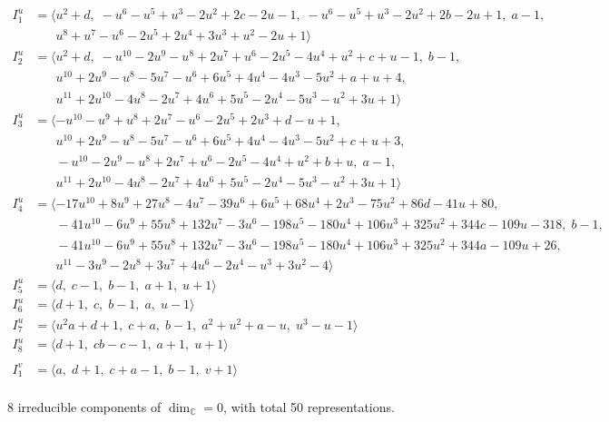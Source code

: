 \documentclass[1p]{elsarticle_modified}
\theoremstyle{definition}
\begin{document}
\begin{align*}
I^u_{1}&=\langle 
u^2+d,\;- u^6- u^5+u^3-2 u^2+2 c-2 u-1,\;- u^6- u^5+u^3-2 u^2+2 b-2 u+1,\;a-1,\\
\phantom{I^u_{1}}&\phantom{= \langle  }u^8+u^7- u^6-2 u^5+2 u^4+3 u^3+u^2-2 u+1\rangle \\
I^u_{2}&=\langle 
u^2+d,\;- u^{10}-2 u^9- u^8+2 u^7+u^6-2 u^5-4 u^4+u^2+c+u-1,\;b-1,\\
\phantom{I^u_{2}}&\phantom{= \langle  }u^{10}+2 u^9- u^8-5 u^7- u^6+6 u^5+4 u^4-4 u^3-5 u^2+a+u+4,\\
\phantom{I^u_{2}}&\phantom{= \langle  }u^{11}+2 u^{10}-4 u^8-2 u^7+4 u^6+5 u^5-2 u^4-5 u^3- u^2+3 u+1\rangle \\
I^u_{3}&=\langle 
- u^{10}- u^9+u^8+2 u^7- u^6-2 u^5+2 u^3+d- u+1,\\
\phantom{I^u_{3}}&\phantom{= \langle  }u^{10}+2 u^9- u^8-5 u^7- u^6+6 u^5+4 u^4-4 u^3-5 u^2+c+u+3,\\
\phantom{I^u_{3}}&\phantom{= \langle  }- u^{10}-2 u^9- u^8+2 u^7+u^6-2 u^5-4 u^4+u^2+b+u,\;a-1,\\
\phantom{I^u_{3}}&\phantom{= \langle  }u^{11}+2 u^{10}-4 u^8-2 u^7+4 u^6+5 u^5-2 u^4-5 u^3- u^2+3 u+1\rangle \\
I^u_{4}&=\langle 
-17 u^{10}+8 u^9+27 u^8-4 u^7-39 u^6+6 u^5+68 u^4+2 u^3-75 u^2+86 d-41 u+80,\\
\phantom{I^u_{4}}&\phantom{= \langle  }-41 u^{10}-6 u^9+55 u^8+132 u^7-3 u^6-198 u^5-180 u^4+106 u^3+325 u^2+344 c-109 u-318,\;b-1,\\
\phantom{I^u_{4}}&\phantom{= \langle  }-41 u^{10}-6 u^9+55 u^8+132 u^7-3 u^6-198 u^5-180 u^4+106 u^3+325 u^2+344 a-109 u+26,\\
\phantom{I^u_{4}}&\phantom{= \langle  }u^{11}-3 u^9-2 u^8+3 u^7+4 u^6-2 u^4- u^3+3 u^2-4\rangle \\
I^u_{5}&=\langle 
d,\;c-1,\;b-1,\;a+1,\;u+1\rangle \\
I^u_{6}&=\langle 
d+1,\;c,\;b-1,\;a,\;u-1\rangle \\
I^u_{7}&=\langle 
u^2 a+d+1,\;c+a,\;b-1,\;a^2+u^2+a- u,\;u^3- u-1\rangle \\
I^u_{8}&=\langle 
d+1,\;c b- c-1,\;a+1,\;u+1\rangle \\
\\
I^v_{1}&=\langle 
a,\;d+1,\;c+a-1,\;b-1,\;v+1\rangle \\
\end{align*}
\raggedright * 8 irreducible components of $\dim_{\mathbb{C}}=0$, with total 50 representations.\\
\end{document}
